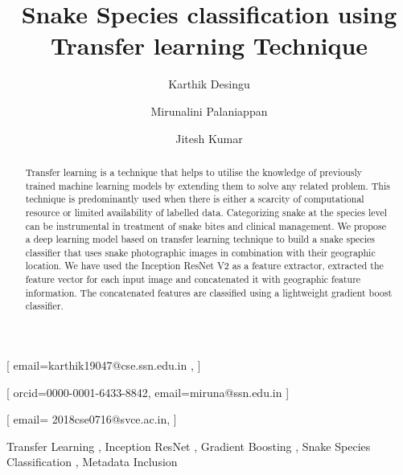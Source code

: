 \documentclass[
]{ceurart}
\begin{document}


\title{Snake Species classification using Transfer learning Technique  }

\author[1]{Karthik Desingu}[%
email=karthik19047@cse.ssn.edu.in ,
]
\address[1]{Department of Computer Science and Engineering,
 Sri Sivasubramaniya Nadar College of Engineering, India}

\author[1]{Mirunalini Palaniappan}[%
orcid=0000-0001-6433-8842,
email=miruna@ssn.edu.in
]

\author[2]{Jitesh Kumar}[%
email= 2018cse0716@svce.ac.in,
]
\address[2]{Department of Computer Science and Engineering,
Sri Venkateshwara College of Engineering, India}




\begin{abstract}
Transfer learning is a technique that helps to utilise the knowledge of previously trained machine learning models by extending them to solve any related problem. This technique is predominantly used when there is either a scarcity of computational resource or limited availability of labelled data. Categorizing snake at the species level can be instrumental in treatment of snake bites and clinical management. We propose a deep learning model based on transfer learning technique to build a snake species classifier that uses snake photographic images in combination with their geographic location. We have used the Inception ResNet V2 as a feature extractor, extracted the feature vector for each input image and concatenated it with geographic feature information. The concatenated features are classified using a lightweight gradient boost classifier.
\end{abstract}

\begin{keywords}
  Transfer Learning \sep
  Inception ResNet \sep
  Gradient Boosting \sep 
  Snake Species Classification \sep 
  Metadata Inclusion
\end{keywords}
\end{document}
